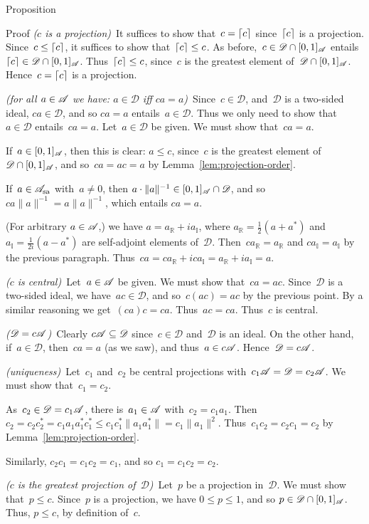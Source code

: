 \documentclass[main]{subfiles}
\begin{document}
\begin{parsec}
\begin{point}{Proposition}
\begin{point}{Proof}
\emph{($c$ is a projection)}\ 
It suffices to show that~$c=\left\lceil c\right\rceil$ since~$\left\lceil c\right\rceil$ is a projection.
Since~$c\leq \left\lceil c\right\rceil$, it suffices to show that~$\left\lceil c\right\rceil\leq c$.
As before,~$c\in \mathscr{D}\cap[0,1]_{\mathscr{A}}$
entails~$\left\lceil c\right\rceil\in\mathscr{D}\cap[0,1]_{\mathscr{A}}$.
Thus~$\left\lceil c\right\rceil\leq c$, since~$c$ is the
greatest element of~$\mathscr{D}\cap[0,1]_{\mathscr{A}}$.
Hence~$c=\left\lceil c\right\rceil$ is a projection.

\emph{(for all $a\in \mathscr{A}$
we have: $a\in \mathscr{D}$ iff $ca=a$)}\ 
Since~$c\in \mathscr{D}$,
and~$\mathscr{D}$ is a two-sided ideal,
$ca\in \mathscr{D}$, and so $ca=a$ entails~$a\in\mathscr{D}$.
Thus we only need to show that~$a\in\mathscr{D}$
entails~$ca=a$.
Let~$a\in\mathscr{D}$
be given.
We must show that~$ca=a$.

If~$a\in [0,1]_{\mathscr{A}}$,
then this is clear:
$a\leq c$, since~$c$ is the greatest element
of~$\mathscr{D}\cap [0,1]_{\mathscr{A}}$,
and so~$ca=ac=a$ by Lemma~\ref{lem:projection-order}.

If~$a\in \mathscr{A}_{\mathrm{sa}}$
with~$a\neq 0$,
then $a\cdot\|a\|^{-1} \in [0,1]_{\mathscr{A}}\cap \mathscr{D}$,
and so $ca \|a\|^{-1} = a \|a\|^{-1}$,
which entails $ca = a$.

(For arbitrary $a\in \mathscr{A}$,)
we have $a= a_{\mathbb{R}} + i a_{\mathbb{I}}$,
where $a_\mathbb{R}=\frac{1}{2}(a+a^*)$
and $a_\mathbb{I} = \frac{1}{2i}(a-a^*)$
are self-adjoint elements of~$\mathscr{D}$.
Then~$ca_\mathbb{R}=a_\mathbb{R}$
and $ca_\mathbb{I}=a_\mathbb{I}$
by the previous paragraph.
Thus~$ca=ca_\mathbb{R}+ica_\mathbb{I}=a_\mathbb{R}+ia_\mathbb{I}=a$.

\emph{($c$ is central)}\ 
Let~$a\in\mathscr{A}$ be given.
We must show that~$ca=ac$.
Since~$\mathscr{D}$ is a two-sided ideal,
we have~$ac\in \mathscr{D}$,
and so~$c(ac)=ac$ by the previous point.
By a similar reasoning we get~$(ca)c=ca$.
Thus~$ac=ca$.
Thus~$c$ is central.

\emph{($\mathscr{D} = c\mathscr{A}$)}\ 
Clearly $c\mathscr{A}\subseteq\mathscr{D}$
since~$c\in\mathscr{D}$ and~$\mathscr{D}$ is an ideal.
On the other hand,
if~$a\in\mathscr{D}$,
then~$ca=a$
(as we saw),
and thus~$a\in c\mathscr{A}$.
Hence~$\mathscr{D} = c\mathscr{A}$.

\emph{(uniqueness)}\ 
Let~$c_1$ and~$c_2$ be central projections 
with~$c_1\mathscr{A} = \mathscr{D}=c_2\mathscr{A}$.
We must show that~$c_1=c_2$.

As~$c_2\in\mathscr{D}=c_1 \mathscr{A}$,
there is~$a_1\in \mathscr{A}$
with~$c_2 = c_1a_1$.
Then~$c_2 = c_2c_2^* = c_1a_1a_1^*c_1^*\leq 
c_1c_1^*\|a_1a_1^*\|=c_1\|a_1\|^2$.
Thus~$c_1c_2=c_2c_1=c_2$ by Lemma~\ref{lem:projection-order}.

Similarly, $c_2c_1 = c_1c_2 = c_1$, and so $c_1=c_1c_2=c_2$.

\emph{($c$ is the greatest projection of~$\mathscr{D}$)}\ 
Let~$p$ be a projection in~$\mathscr{D}$.
We must show that~$p\leq c$.
Since~$p$ is a projection,
we have $0\leq p\leq 1$, and so $p\in \mathscr{D}\cap [0,1]_{\mathscr{A}}$.
Thus, $p\leq c$, by definition of~$c$.
\end{point}
\end{point}


\end{parsec}
\end{document}
